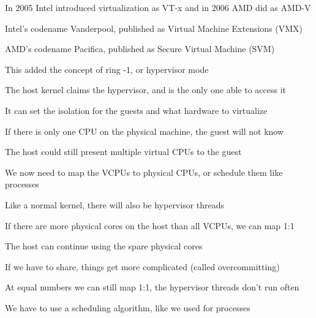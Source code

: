   \begin{slide}
    

    In 2005 Intel introduced virtualization as VT-x and in 2006 AMD did as AMD-V

    \leftspace{}Intel's codename Vanderpool, published as Virtual
                 Machine Extensions (VMX)

    \leftspace{}AMD's codename Pacifica, published as Secure Virtual
                 Machine (SVM)
    \medskip

    This added the concept of ring -1, or hypervisor mode
    \medskip

    The host kernel claims the hypervisor, and is the only one able to access
    it

    \leftspace{}It can set the isolation for the guests and what hardware
                 to virtualize

  \end{slide}

  \begin{slide}
    

    If there is only one CPU on the physical machine, the guest will not know

    \leftspace{}The host could still present multiple virtual CPUs to the guest
    \medskip

    We now need to map the VCPUs to physical CPUs, or schedule them like
    processes

    \leftspace{}Like a normal kernel, there will also be hypervisor threads

  \end{slide}

  \begin{slide}
    

    If there are more physical cores on the host than all VCPUs, we can map 1:1

    \leftspace{}The host can continue using the spare physical cores
    \medskip

    If we have to share, things get more complicated (called overcommitting)

    \leftspace{}At equal numbers we can still map 1:1, the hypervisor threads
                 don't run often
    \medskip

    We have to use a scheduling algorithm, like we used for processes

  \end{slide}


